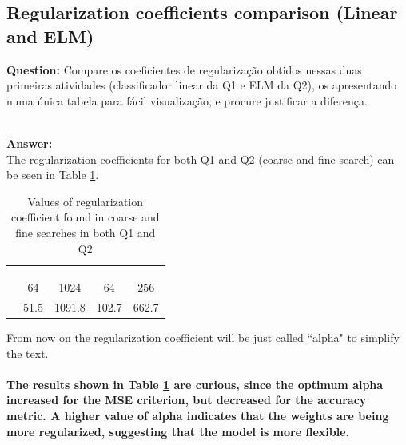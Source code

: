\documentclass[a4paper]{article}    %
\begin{document}
\newpage

\subsection{Regularization coefficients comparison (Linear and ELM)}

\textbf{Question:} \newline
Compare os coeficientes de regularização obtidos nessas duas primeiras atividades (classificador linear da Q1 e ELM da Q2), os apresentando numa única tabela para fácil visualização, e procure justificar a diferença. 

\textbf{\\Answer:}\\
The regularization coefficients for both Q1 and Q2 (coarse and fine search) can be seen in Table \ref{tab:alpha_comp}.

\begin{table}[H]
    \begin{center}
        \begin{tabular}{r|c|c|c|c|}
            \cline{2-5}
            & \multicolumn{4}{|c|}{\cellcolor[gray]{0.8}{$\lambda$ optimum}} \\
            \cline{2-5}
            & \multicolumn{2}{|c|}{\cellcolor[gray]{0.8}{Q1}} & \multicolumn{2}{|c|}{\cellcolor[gray]{0.8}{Q2}} \\
            \cline{2-5}
            & \cellcolor[gray]{0.8}{MSE} & \cellcolor[gray]{0.8}{Accuracy} & \cellcolor[gray]{0.8}{MSE} & \cellcolor[gray]{0.8}{Accuracy} \\
            \cline{1-5}
            \multicolumn{1}{|r|}{\cellcolor[gray]{0.8}{coarse search}} & 64   & 1024   & 64   & 256   \\
            \cline{1-5}
            \multicolumn{1}{|r|}{\cellcolor[gray]{0.8}{fine search}}   & 51.5 & 1091.8 & 102.7 & 662.7 \\
            \cline{1-5}
        \end{tabular}
    \end{center}
    \caption{Values of regularization coefficient found in coarse and fine searches in both Q1 and Q2}
    \label{tab:alpha_comp}
\end{table}

From now on the regularization coefficient will be just called ``alpha" to simplify the text.
%
\paragraph{The results shown in Table \ref{tab:alpha_comp} are curious, since the optimum alpha increased for the MSE criterion, but decreased for the accuracy metric. A higher value of alpha indicates that the weights are being more regularized, suggesting that the model is more flexible.}
%
\end{document}
